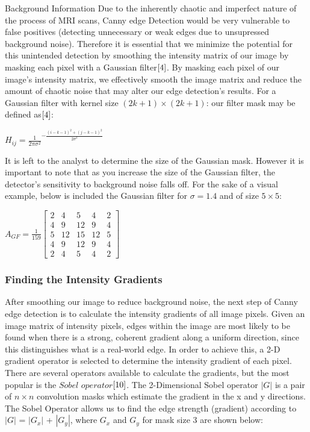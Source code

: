 \documentclass[a4paper,12pt]{article}
\begin{document}
\begin{section}{Background Information}
Due to the inherently chaotic and imperfect nature of the process of MRI scans, Canny edge Detection would be very vulnerable to false positives (detecting unnecessary or weak edges due to unsupressed background noise). Therefore it is essential that we minimize the potential for this unintended detection by smoothing the intensity matrix of our image by masking each pixel with a Gaussian filter$\cite{4}$.%
By masking each pixel of our image's intensity matrix, we effectively smooth the image matrix and reduce the amount of chaotic noise that may alter our edge detection's results. For a Gaussian filter with kernel size $(2k+1)\times(2k+1)$: our filter mask may be defined as$\cite{4}$:\\%
\begin{center}
$H_{ij} = \frac{1}{2\pi\sigma^{2}}^{-\frac{(i-k-1)^2+(j-k-1)^2}{2\sigma^2}}$
\end{center}

It is left to the analyst to determine the size of the Gaussian mask.
However it is important to note that as you increase the size of the Gaussian filter, the detector's sensitivity to background noise falls off.
For the sake of a visual example, below is included the Gaussian filter for $\sigma = 1.4$ and of size $5\times5$:\\

\singlespacing
\begin{center}
$A_{GF} = \frac{1}{159}\begin{bmatrix}
	2	&	4	&	5	&	4	&	2\\
	4	&	9	&	{12}	&	9	&	4\\
	5	&	{12}	&	{15}	&	{12}	&	5\\
	4       &       9       &       {12}    &       9       &       4\\
	2       &       4       &       5       &       4       &       2
\end{bmatrix}$
\end{center}
\doublespacing

\subsubsection{Finding the Intensity Gradients}

After smoothing our image to reduce background noise, the next step of Canny edge detection is to calculate the intensity gradients of all image pixels. Given an image matrix of intensity pixels, edges within the image are most likely to be found when there is a strong, coherent gradient along a uniform direction, since this distinguishes what is a real-world edge. In order to achieve this, a 2-D gradient operator is selected to determine the intensity gradient of each pixel. There are several operators available to calculate the gradients, but the most popular is the $Sobel$ $operator$$\cite{10}$.%
The 2-Dimensional Sobel operator $|G|$ is a pair of $n\times n$ convolution masks which estimate the gradient in the x and y directions. The Sobel Operator allows us to find the edge strength (gradient) according to $|G|$ = $|G_x|$ + $|G_y|$, where $G_x$ and $G_y$ for mask size 3 are shown below:


\end{section}
\end{document}
